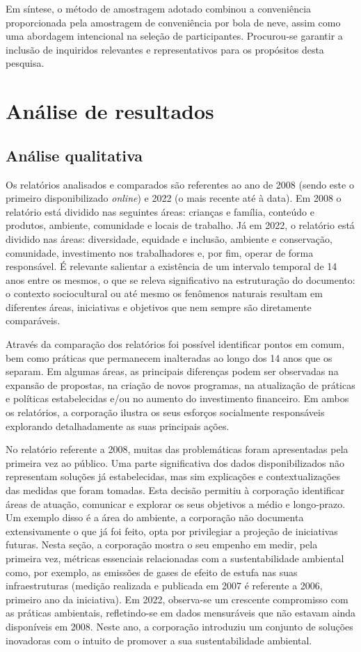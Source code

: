 \documentclass[portuguese]{textolivre}
\begin{document}
Em síntese, o método de amostragem adotado combinou a conveniência proporcionada pela amostragem de conveniência por bola de neve, assim como uma abordagem intencional na seleção de participantes. Procurou-se garantir a inclusão de inquiridos relevantes e representativos para os propósitos desta pesquisa. 

\section{Análise de resultados}\label{sec-secoes}
\subsection{Análise qualitativa}
Os relatórios analisados e comparados são referentes ao ano de 2008 (sendo este o primeiro disponibilizado \textit{online}) e 2022 (o mais recente até à data). Em 2008 o relatório está dividido nas seguintes áreas: crianças e família, conteúdo e produtos, ambiente, comunidade e locais de trabalho. Já em 2022, o relatório está dividido nas áreas: diversidade, equidade e inclusão, ambiente e conservação, comunidade, investimento nos trabalhadores e, por fim, operar de forma responsável. É relevante salientar a existência de um intervalo temporal de 14 anos entre os mesmos, o que se releva significativo na estruturação do documento: o contexto sociocultural ou até mesmo os fenômenos naturais resultam em diferentes áreas, iniciativas e objetivos que nem sempre são diretamente comparáveis. 

Através da comparação dos relatórios foi possível identificar pontos em comum, bem como práticas que permanecem inalteradas ao longo dos 14 anos que os separam. Em algumas áreas, as principais diferenças podem ser observadas na expansão de propostas, na criação de novos programas, na atualização de práticas e políticas estabelecidas e/ou no aumento do investimento financeiro. Em ambos os relatórios, a corporação ilustra os seus esforços socialmente responsáveis explorando detalhadamente as suas principais ações. 

No relatório referente a 2008, muitas das problemáticas foram apresentadas pela primeira vez ao público. Uma parte significativa dos dados disponibilizados não representam soluções já estabelecidas, mas sim explicações e contextualizações das medidas que foram tomadas. Esta decisão permitiu à corporação identificar áreas de atuação, comunicar e explorar os seus objetivos a médio e longo-prazo. Um exemplo disso é a área do ambiente, a corporação não documenta extensivamente o que já foi feito, opta por privilegiar a projeção de iniciativas futuras. Nesta seção, a corporação mostra o seu empenho em medir, pela primeira vez, métricas essenciais relacionadas com a sustentabilidade ambiental como, por exemplo, as emissões de gases de efeito de estufa nas suas infraestruturas (medição realizada e publicada em 2007 é referente a 2006, primeiro ano da iniciativa). Em 2022, observa-se um crescente compromisso com as práticas ambientais, refletindo-se em dados mensuráveis que não estavam ainda disponíveis em 2008. Neste ano, a corporação introduziu um conjunto de soluções inovadoras com o intuito de promover a sua sustentabilidade ambiental. 
\end{document}
